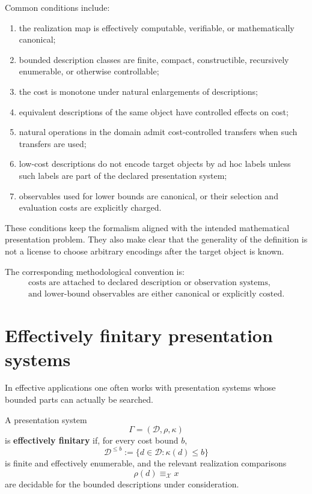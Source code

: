 \documentclass[11pt]{article}
\begin{document}
Common conditions include:
\begin{enumerate}[label=(\roman*)]
\item the realization map is effectively computable, verifiable, or mathematically canonical;
\item bounded description classes are finite, compact, constructible, recursively enumerable, or otherwise controllable;
\item the cost is monotone under natural enlargements of descriptions;
\item equivalent descriptions of the same object have controlled effects on cost;
\item natural operations in the domain admit cost-controlled transfers when such transfers are used;
\item low-cost descriptions do not encode target objects by ad hoc labels unless such labels are part of the declared presentation system;
\item observables used for lower bounds are canonical, or their selection and evaluation costs are explicitly charged.
\end{enumerate}

These conditions keep the formalism aligned with the intended mathematical presentation problem. They also make clear that the generality of the definition is not a license to choose arbitrary encodings after the target object is known.

The corresponding methodological convention is:
\[
\begin{gathered}
\text{costs are attached to declared description or observation systems,}\\
\text{and lower-bound observables are either canonical or explicitly costed.}
\end{gathered}
\]

\section{Effectively finitary presentation systems}

In effective applications one often works with presentation systems whose bounded parts can actually be searched.

A presentation system
\[
\Gamma=(\mathcal D,\rho,\kappa)
\]
is \textbf{effectively finitary} if, for every cost bound \(b\),
\[
\mathcal D^{\leq b}:=\{d\in\mathcal D:\kappa(d)\leq b\}
\]
is finite and effectively enumerable, and the relevant realization comparisons
\[
\rho(d)\equiv_\mathcal X x
\]
are decidable for the bounded descriptions under consideration.
\end{document}
